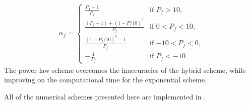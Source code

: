 \begin{itemize}
\begin{eqnarray}
\alpha_f = 
\begin{cases}
    \frac{P_f-1}{P_f} & \text{if $P_f > 10$,} \\
    \frac{(P_f-1)+(1-P/10)^5}{P_f} & \text{if $0 < P_f < 10$,} \\
    \frac{(1-P_f/10)^5 - 1}{P_f} & \text{if $-10 < P_f < 0$,} \\
    -\frac{1}{P_f} & \text{if $P_f < -10$.}
\end{cases}
\label{eqn:num:pls}
\end{eqnarray}
The power law scheme overcomes the inaccuracies of the hybrid scheme,
while improving on the computational time for the exponential scheme.
\end{itemize}

All of the numerical schemes presented here are implemented in \FiPy{}.







